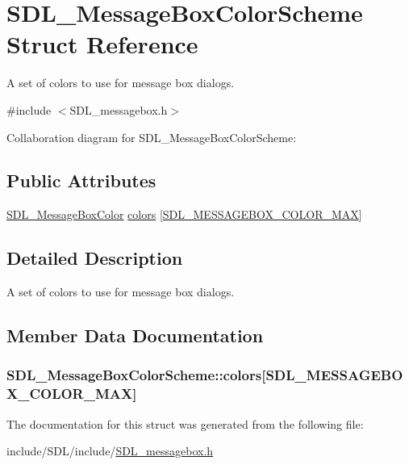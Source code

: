\hypertarget{struct_s_d_l___message_box_color_scheme}{\section{S\-D\-L\-\_\-\-Message\-Box\-Color\-Scheme Struct Reference}
\label{struct_s_d_l___message_box_color_scheme}
}


A set of colors to use for message box dialogs.  




{\ttfamily \#include $<$S\-D\-L\-\_\-messagebox.\-h$>$}



Collaboration diagram for S\-D\-L\-\_\-\-Message\-Box\-Color\-Scheme\-:
\subsection*{Public Attributes}
\begin{DoxyCompactItemize}
\item 
\hyperlink{struct_s_d_l___message_box_color}{S\-D\-L\-\_\-\-Message\-Box\-Color} \hyperlink{struct_s_d_l___message_box_color_scheme_ae3712ec81e41b63b781b7d49d3b3b8f6}{colors} \mbox{[}\hyperlink{_s_d_l__messagebox_8h_a75e562d38bc214725e01f4f829bc1567a0a575b056603e38e844b141c83a44d89}{S\-D\-L\-\_\-\-M\-E\-S\-S\-A\-G\-E\-B\-O\-X\-\_\-\-C\-O\-L\-O\-R\-\_\-\-M\-A\-X}\mbox{]}
\end{DoxyCompactItemize}


\subsection{Detailed Description}
A set of colors to use for message box dialogs. 

\subsection{Member Data Documentation}
\hypertarget{struct_s_d_l___message_box_color_scheme_ae3712ec81e41b63b781b7d49d3b3b8f6}{
\subsubsection[{colors}]{ S\-D\-L\-\_\-\-Message\-Box\-Color\-Scheme\-::colors\mbox{[}{\bf S\-D\-L\-\_\-\-M\-E\-S\-S\-A\-G\-E\-B\-O\-X\-\_\-\-C\-O\-L\-O\-R\-\_\-\-M\-A\-X}\mbox{]}}}\label{struct_s_d_l___message_box_color_scheme_ae3712ec81e41b63b781b7d49d3b3b8f6}


The documentation for this struct was generated from the following file\-:\begin{DoxyCompactItemize}
\item 
include/\-S\-D\-L/include/\hyperlink{_s_d_l__messagebox_8h}{S\-D\-L\-\_\-messagebox.\-h}\end{DoxyCompactItemize}
